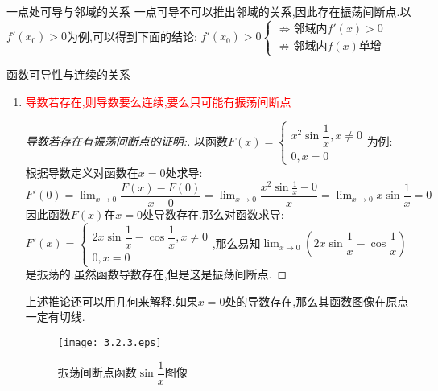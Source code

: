 \documentclass[8pt a4paper, oneside, UTF8]{ctexbook}  %
\begin{document}
\begin{sloppypar}
\begin{note}
    \end{note}
    \begin{lemma}{一点处可导与邻域的关系}{}
        一点可导不可以推出邻域的关系,因此存在振荡间断点.以$f'(x_0)>0$为例,可以得到下面的结论:
        $f'(x_0)>0\begin{cases}
                \nRightarrow \text{邻域内}f'(x)>0 \\
                \nRightarrow \text{邻域内}f(x)\text{单增}
            \end{cases}$
    \end{lemma}
    \begin{criterion}{函数可导性与连续的关系}{}
        \begin{enumerate}
            \item \textcolor{red}{导数若存在,则导数要么连续,要么只可能有振荡间断点}
                  \begin{proof}[导数若存在有振荡间断点的证明:]
                      以函数$F(x)=\begin{cases}
                              x^2 \sin \dfrac{1}{x} ,x \neq 0 \\
                              0,x=0
                          \end{cases}$为例:
                      \\根据导数定义对函数在$x=0$处求导:$F'(0)=\lim_{x\to 0}\dfrac{F(x)-F(0)}{x-0}=\lim_{x\to 0}\dfrac{x^2 \sin \frac1x - 0}{x}=\lim_{x\to 0}x \sin \dfrac{1}{x}=0$因此函数$F(x)$在$x=0$处导数存在.那么对函数求导:\\
                      $F'(x)=\begin{cases}
                              2x \sin \dfrac{1}{x} -\cos \dfrac{1}{x} ,x\neq 0 \\
                              0 ,x=0
                          \end{cases}$,那么易知$\lim_{x\to 0}\left(2 x \sin \dfrac{1}{x} -\cos \dfrac{1}{x} \right)$是振荡的.虽然函数导数存在,但是这是振荡间断点.
                  \end{proof}
                  上述推论还可以用几何来解释.如果$x=0$处的导数存在,那么其函数图像在原点一定有切线.
                  \begin{figure}[H]
                      \begin{minipage}[t]{0.5\linewidth}
                          \centering
                          \texttt{[image: 3.2.3.eps]}
                          \caption{振荡间断点函数$\sin \dfrac{1}{x}$图像}
                      \end{minipage}%

\end{figure}
\end{enumerate}
\end{criterion}
\end{sloppypar}
\end{document}

